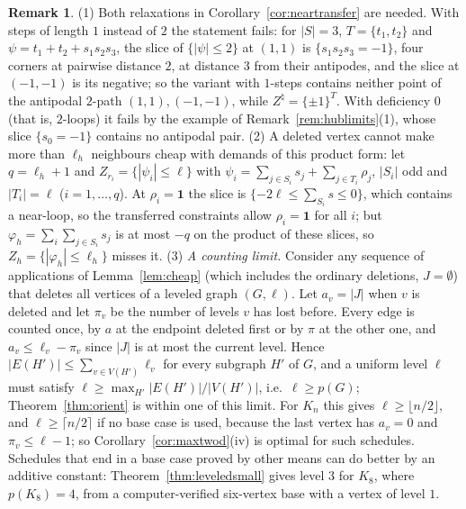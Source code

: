 \documentclass[11pt,letterpaper]{article}
\theoremstyle{definition}
\newtheorem{remark}[theorem]{Remark}
\newcommand{\cube}[1]{\{\pm1\}^{#1}}
\begin{document}
\begin{remark}\label{rem:nearlimits}
(1) Both relaxations in Corollary~\ref{cor:neartransfer} are needed. With steps of length $1$ instead of
$2$ the statement fails: for $|S|=3$, $T=\{t_1,t_2\}$ and $\psi=t_1+t_2+s_1s_2s_3$, the slice of
$\{|\psi|\le2\}$ at $(1,1)$ is $\{s_1s_2s_3=-1\}$, four corners at pairwise distance $2$, at distance $3$
from their antipodes, and the slice at $(-1,-1)$ is its negative; so the variant with $1$-steps contains
neither point of the antipodal $2$-path $(1,1),(-1,-1)$, while $Z^\natural=\cube T$. With deficiency $0$
(that is, $2$-loops) it fails by the example of Remark~\ref{rem:hublimits}(1), whose slice $\{s_0=-1\}$
contains no antipodal pair.
(2) A deleted vertex cannot make more than $\ell_h$ neighbours cheap with demands of this product form:
let $q=\ell_h+1$ and $Z_{r_i}=\{|\psi_i|\le\ell\}$ with $\psi_i=\sum_{j\in S_i}s_j+\sum_{j\in T_i}\rho_j$,
$|S_i|$ odd and $|T_i|=\ell$ ($i=1,\dots,q$). At $\rho_i=\mathbf 1$ the slice is
$\{-2\ell\le\sum_{S_i}s\le0\}$, which contains a near-loop, so the transferred constraints allow
$\rho_i=\mathbf 1$ for all $i$; but $\varphi_h=\sum_i\sum_{j\in S_i}s_j$ is at most $-q$ on the product
of these slices, so $Z_h=\{|\varphi_h|\le\ell_h\}$ misses it.
(3) \emph{A counting limit.} Consider any sequence of applications of Lemma~\ref{lem:cheap} (which
includes the ordinary deletions, $J=\emptyset$) that deletes all vertices of a leveled graph
$(G,\ell)$. Let $a_v=|J|$ when $v$ is deleted and let $\pi_v$ be the number of levels $v$ has lost
before. Every edge is counted once, by $a$ at the endpoint deleted first or by $\pi$ at the other
one, and $a_v\le\ell_v-\pi_v$ since $|J|$ is at most the current level. Hence
$|E(H')|\le\sum_{v\in V(H')}\ell_v$ for every subgraph $H'$ of $G$, and a uniform level $\ell$ must
satisfy $\ell\ge\max_{H'}|E(H')|/|V(H')|$, i.e.\ $\ell\ge p(G)$; Theorem~\ref{thm:orient} is within one
of this limit. For $K_n$ this gives $\ell\ge\lfloor n/2\rfloor$, and $\ell\ge\lceil n/2\rceil$ if no base
case is used, because the last vertex has $a_v=0$ and $\pi_v\le\ell-1$; so Corollary~\ref{cor:maxtwod}(iv)
is optimal for such schedules. Schedules that end in a base case proved by other means can do better
by an additive constant: Theorem~\ref{thm:leveledsmall} gives level $3$ for $K_8$, where $p(K_8)=4$, from
a computer-verified six-vertex base with a vertex of level $1$.
\end{remark}
\end{document}

